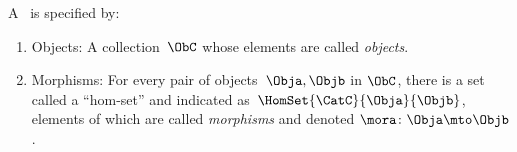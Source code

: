 \begin{ctdefinition}[Semicategory]
    \label{def:semicategory-compact}
    A ~\CatC is specified by:
    \begin{body}
        \constit
        \begin{enumerate}
            \item \label{semicategory-objects}
                  Objects: A collection\footnotemark~$\ObC$ whose elements are called \emph{objects}.
            \item \label{def:hom-set}
                  Morphisms: For every pair of objects~$\Obja,\Objb$ in $\ObC$, there is a set called a ``hom-set'' and indicated as~$\HomSet{\CatC}{\Obja}{\Objb}$, elements of which are called \emph{morphisms} and denoted $\mora \colon \Obja \mto \Objb$.


\end{enumerate}
\end{body}
\end{ctdefinition}
